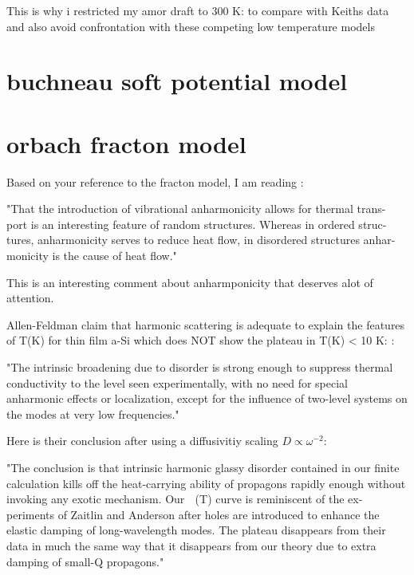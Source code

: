 \documentclass{article}
\begin{document}
This is why i restricted my amor draft to 300 K: to compare with Keiths data and also avoid confrontation with these competing low temperature models




\section{buchneau soft potential model}
\cite{buchneau_interaction_1992}

\section{orbach fracton model}

Based on your reference to the fracton model, 
I am reading \cite{orbach_phonon_1993}:

"That the introduction of vibrational
anharmonicity allows for thermal trans-
port is an interesting feature of random
structures. Whereas in ordered struc-
tures, anharmonicity serves to reduce
heat flow, in disordered structures anhar-
monicity is the cause of heat flow."

This is an interesting comment about anharmponicity that deserves 
alot of attention. 

Allen-Feldman claim that harmonic scattering is adequate to explain the 
features of T(K) for thin film a-Si which does NOT show the plateau in 
T(K) < 10 K:
\cite{feldman_numerical_1999}:

"The intrinsic broadening due to disorder is strong enough to suppress
thermal conductivity to the level seen experimentally, with no need for 
special anharmonic effects or localization, except for the influence of 
two-level systems on the modes at very low frequencies."

Here is their conclusion after using a diffusivitiy scaling 
$D \propto \omega^{-2}$:

"The conclusion is that intrinsic harmonic glassy disorder
contained in our finite calculation kills off the heat-carrying
ability of propagons rapidly enough without invoking any
exotic mechanism. Our ␬ (T) curve is reminiscent of the ex-
periments of Zaitlin and Anderson after holes are introduced
to enhance the elastic damping of long-wavelength modes.
The plateau disappears from their data in much the same way
that it disappears from our theory due to extra damping of
small-Q propagons."
\end{document}
